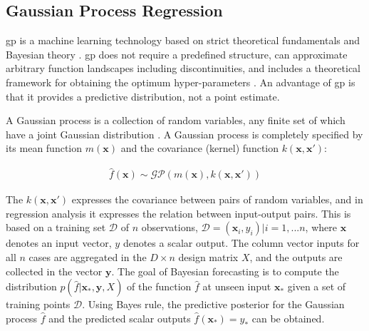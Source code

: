 \documentclass[11pt, runningheads,a4paper]{llncs}
\begin{document}

\subsection{Gaussian Process Regression}

\ac{gp} is a machine learning technology based on strict theoretical fundamentals and Bayesian theory \cite{Seeger04gaussianprocesses,Rasmussen06gaussianprocesses}. \ac{gp} does not require a predefined structure, can approximate arbitrary function landscapes including discontinuities, and includes a theoretical framework for obtaining the optimum hyper-parameters \cite{5194095}. An advantage of \ac{gp} is that it provides a predictive distribution, not a point estimate.

A Gaussian process is a collection of random variables, any finite set of which have a joint Gaussian distribution \cite{Seeger04gaussianprocesses}. A Gaussian process is completely specified by its mean function $m(\mathbf{x})$ and the covariance (kernel) function $k(\mathbf{x},\mathbf{x'})$:



\begin{align} 
\hat{f}(\mathbf{x}) \sim \mathcal{G}\mathcal{P}(m(\mathbf{x}),k(\mathbf{x},\mathbf{x'}))
\end{align}


The $k(\mathbf{x},\mathbf{x'})$ expresses the covariance between pairs of random variables, and in regression analysis it expresses the relation between input-output pairs. This is based on a training set $\mathcal{D}$ of $n$ observations, $\mathcal{D}={(\mathbf{x}_i,y_{i}) | i = 1, ... n} $, where $\mathbf{x}$ denotes an input vector, $y$ denotes a scalar output. The column vector inputs for all $n$ cases are aggregated in the $D \times n$ design matrix $X$, and the outputs are collected in the vector $\mathbf{y}$. The goal of Bayesian forecasting is to compute the distribution $p(\hat{f}|\mathbf{x_*},\mathbf{y},X)$ of the function $\hat{f}$ at unseen input $\mathbf{x_{*}}$ given a set of training points $\mathcal{D}$. Using Bayes rule, the predictive posterior for the Gaussian process $\hat{f}$ and the predicted scalar outputs $\hat{f}(\mathbf{x_*})=y_*$ can be obtained.

\end{document}
